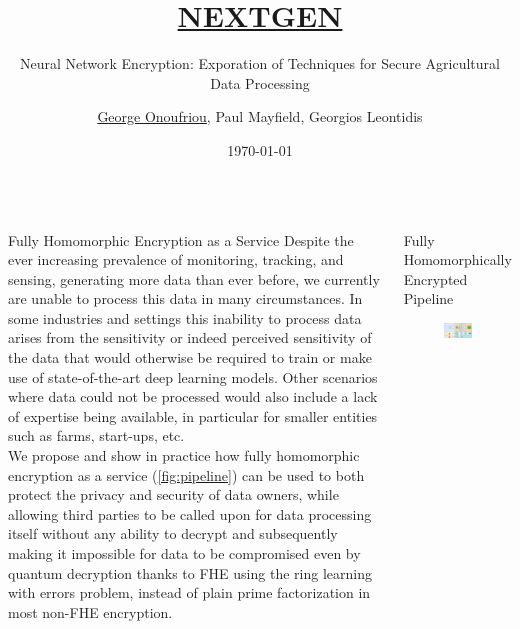 \documentclass{beamer}
\title[\href{https://nextgen.abdn.ac.uk}{NEXTGEN}]{\href{https://nextgen.abdn.ac.uk}{NEXTGEN}}
\subtitle{Neural Network Encryption: Exporation of Techniques for Secure Agricultural Data Processing}
\author[\href{https://nextgen.abdn.ac.uk}{nextgen.abdn.ac.uk} or \href{https://cryptolog.io}{cryptolog.io}]{\href{https://cryptolog.io}{George Onoufriou}, Paul Mayfield, Georgios Leontidis}
\date{\today}
\begin{document}
  \begin{frame}
    \maketitle
    \begin{columns}
      \begin{column}{0.3\textwidth}
        \begin{block}{Fully Homomorphic Encryption as a Service}
          Despite the ever increasing prevalence of monitoring, tracking, and sensing, generating more data than ever before, we currently are unable to process this data in many circumstances. In some industries and settings this inability to process data arises from the sensitivity or indeed perceived sensitivity of the data that would otherwise be required to train or make use of state-of-the-art deep learning models. Other scenarios where data could not be processed would also include a lack of expertise being available, in particular for smaller entities such as farms, start-ups, etc. \\
          We propose and show in practice how fully homomorphic encryption as a service (\ref{fig:pipeline}) can be used to both protect the privacy and security of data owners, while allowing third parties to be called upon for data processing itself without any ability to decrypt \autocite{gentry2009fully} and subsequently making it impossible for data to be compromised even by quantum decryption thanks to FHE using the ring learning with errors problem, instead of plain prime factorization in most non-FHE encryption.
        \end{block}
      \end{column}
      \begin{column}{0.35\textwidth}
        \begin{block}{Fully Homomorphically Encrypted Pipeline}
          \begin{figure}
            \centering
            \includegraphics[width=\textwidth]{nextgen.png}

\end{figure}
\end{block}
\end{column}
\end{columns}
\end{frame}
\end{document}
